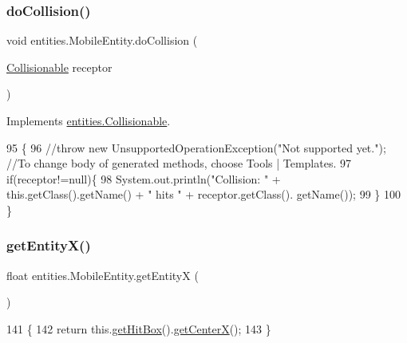 \subsubsection{\texorpdfstring{do\+Collision()}{doCollision()}}
{\footnotesize\ttfamily void entities.\+Mobile\+Entity.\+do\+Collision (\begin{DoxyParamCaption}\item[{\mbox{\hyperlink{interfaceentities_1_1_collisionable}{Collisionable}}}]{receptor }\end{DoxyParamCaption})\hspace{0.3cm}{\ttfamily [inline]}}



Implements \mbox{\hyperlink{interfaceentities_1_1_collisionable_aaebba0fda34be003cfe326471e1418c8}{entities.\+Collisionable}}.


\begin{DoxyCode}
95                                                     \{
96         \textcolor{comment}{//throw new UnsupportedOperationException("Not supported yet."); //To change body of generated
       methods, choose Tools | Templates.}
97         \textcolor{keywordflow}{if}(receptor!=null)\{
98             System.out.println(\textcolor{stringliteral}{"Collision: "} + this.getClass().getName() + \textcolor{stringliteral}{" hits "} + receptor.getClass().
      getName());
99         \}
100     \}
\end{DoxyCode}
\mbox{\label{classentities_1_1_mobile_entity_a49dea6e4e953167028704395a99138fb}} 
\subsubsection{\texorpdfstring{get\+Entity\+X()}{getEntityX()}}
{\footnotesize\ttfamily float entities.\+Mobile\+Entity.\+get\+EntityX (\begin{DoxyParamCaption}{ }\end{DoxyParamCaption})\hspace{0.3cm}{\ttfamily [inline]}}


\begin{DoxyCode}
141                              \{
142         \textcolor{keywordflow}{return} this.\mbox{\hyperlink{classentities_1_1_mobile_entity_a7192f025dc20283c5eee9efb9d5b4b6f}{getHitBox}}().\mbox{\hyperlink{classorg_1_1newdawn_1_1slick_1_1geom_1_1_shape_aa8f8cb519727d4ef8737819b4f1dd7b6}{getCenterX}}();
143     \}
\end{DoxyCode}
\mbox{\label{classentities_1_1_mobile_entity_a8e231bee5ceaa0c240e9a8519e051d6b}} 

